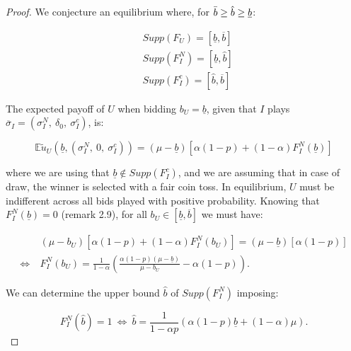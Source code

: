 \documentclass[11pt]{article}
\theoremstyle{plain}
\theoremstyle{definition}
\theoremstyle{plain}
\theoremstyle{plain}
\theoremstyle{plain}
\theoremstyle{plain}
\numberwithin{equation}{section}
\begin{document}
\begin{proof}
\noindent We conjecture an equilibrium where, for $ \Bar{b}  \geq \hat{b} \geq \underline{b} $:

\begin{align*}
    & Supp\left( F_U \right) = [\underline{b},\overline{b}] \\[8pt]
    & Supp\left( F_I^N \right) = [\underline{b},\hat{b}] \\[8pt]
    & Supp\left( F_I^c \right) = [\hat{b},\overline{b}]
\end{align*}

\vspace{0.4cm}
    
\noindent The expected payoff of $ U $ when bidding $ b_U = \underline{b} $, given that $ I $ plays $ \overline{\sigma}_I = \left( \sigma_I^N,\ \delta_0,\ \sigma_I^c \right) $, is:

\vspace{0.2cm}

\begin{equation*}
    \mathbb{E}\tilde{u}_U \left(\underline{b}, \left(\sigma_I^N,\ 0,\ \sigma_I^c \right) \right) = (\mu-\underline{b})\left[\alpha(1-p) + (1-\alpha)F_I^N(\underline{b})\right]
\end{equation*}

\vspace{0.4cm}

\noindent where we are using that $ \underline{b} \notin Supp\left( F_I^c \right) $, and we are assuming that in case of draw, the winner is selected with a fair coin toss. In equilibrium, $ U $ must be indifferent across all bids played with positive probability. Knowing that $F_I^N(\underline{b}) = 0 $ (remark 2.9), for all $ b_U \in [\underline{b},\overline{b}] $ we must have:

{\small
\begin{align*}
    & (\mu-b_U) \left[\alpha(1-p) + (1-\alpha)F_I^N(b_U)\right] =  (\mu-\underline{b})\left[\alpha(1-p)\right] \\[8pt]
    \iff \ & F_I^N(b_U) = \frac{1}{1-\alpha} \left(\frac{\alpha(1-p)(\mu-\underline{b})}{\mu-b_U} - \alpha(1-p) \right).
\end{align*}
}

\vspace{0.4cm}

\noindent We can determine the upper bound $ \hat{b} $ of $ Supp \left(  F_I^N \right) $ imposing:

\begin{equation*}
     F_I^N(\hat{b}) = 1 \ \iff \ \hat{b} = \frac{1}{1-\alpha p}\left(\alpha(1-p)\underline{b}  + (1-\alpha)\mu \right).
\end{equation*}


\end{proof}
\end{document}
